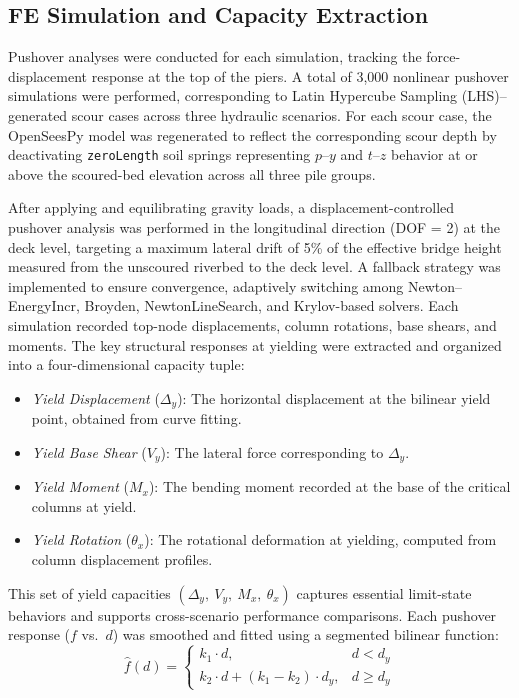 \documentclass[authoryear,preprint,review,12pt]{elsarticle}
\begin{document}
\subsection{FE Simulation and Capacity Extraction}

Pushover analyses were conducted for each simulation, tracking the force-displacement response at the top of the piers. A total of 3,000 nonlinear pushover simulations were performed, corresponding to Latin Hypercube Sampling (LHS)–generated scour cases across three hydraulic scenarios. For each scour case, the OpenSeesPy model was regenerated to reflect the corresponding scour depth by deactivating \texttt{zeroLength} soil springs representing $p$–$y$ and $t$–$z$ behavior at or above the scoured-bed elevation across all three pile groups.

After applying and equilibrating gravity loads, a displacement-controlled pushover analysis was performed in the longitudinal direction (DOF = 2) at the deck level, targeting a maximum lateral drift of 5\% of the effective bridge height measured from the unscoured riverbed to the deck level. A fallback strategy was implemented to ensure convergence, adaptively switching among Newton–EnergyIncr, Broyden, NewtonLineSearch, and Krylov-based solvers. Each simulation recorded top-node displacements, column rotations, base shears, and moments. The key structural responses at yielding were extracted and organized into a four-dimensional capacity tuple:

\begin{itemize}
    \item \textit{Yield Displacement} ($\Delta_y$): The horizontal displacement at the bilinear yield point, obtained from curve fitting.
    \item \textit{Yield Base Shear} ($V_y$): The lateral force corresponding to $\Delta_y$.
    \item \textit{Yield Moment} ($M_x$): The bending moment recorded at the base of the critical columns at yield.
    \item \textit{Yield Rotation} ($\theta_x$): The rotational deformation at yielding, computed from column displacement profiles.
\end{itemize}

This set of yield capacities $(\Delta_y,\ V_y,\ M_x,\ \theta_x)$ captures essential limit-state behaviors and supports cross-scenario performance comparisons. Each pushover response ($f$ vs.\ $d$) was smoothed and fitted using a segmented bilinear function:
\begin{equation}
\hat{f}(d) = 
\begin{cases}
    k_1 \cdot d, & d < d_y \\
    k_2 \cdot d + (k_1 - k_2) \cdot d_y, & d \geq d_y
\end{cases}
\label{eq:bilinear_fit}
\end{equation}
\end{document}
